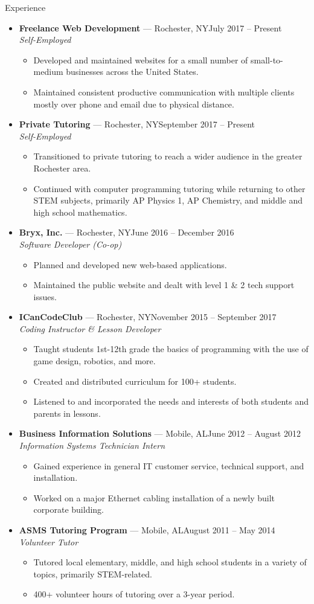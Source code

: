 \documentclass[10pt,oneside]{article}
\newenvironment{ressection}[1]{
	\vspace{3pt}
	{\fontfamily{bch}\selectfont\Large#1}
	\begin{itemize}
	\vspace{2pt}
}{
	\end{itemize}
}
\newcommand{\ressubitem}[1]{
	\vspace{-1pt}
	\item \begin{flushleft} #1 \end{flushleft}
}
\newcommand{\resbigitem}[3]{
	\vspace{-3pt}
	\item
	\textbf{#1} --- #2 \\
	\textit{#3}
}
\newenvironment{ressubsec}[3]{
	\resbigitem{#1}{#2}{#3}
	\vspace{-1pt}
	\begin{itemize}
}{
	\end{itemize}
}
\begin{document}
\begin{ressection}{Experience}

	\begin{ressubsec}{Freelance Web Development}{Rochester, NY\hfill July 2017 -- Present}{Self-Employed}
		\ressubitem{Developed and maintained websites for a small number of small-to-medium businesses across the United States.}
		\ressubitem{Maintained consistent productive communication with multiple clients mostly over phone and email due to physical distance.}
	\end{ressubsec}
	
	\begin{ressubsec}{Private Tutoring}{Rochester, NY\hfill September 2017 -- Present}{Self-Employed}
		\ressubitem{Transitioned to private tutoring to reach a wider audience in the greater Rochester area.}
		\ressubitem{Continued with computer programming tutoring while returning to other STEM subjects, primarily AP Physics 1, AP Chemistry, and middle and high school mathematics.}
	\end{ressubsec}
	
	\begin{ressubsec}{Bryx, Inc.}{Rochester, NY\hfill June 2016 -- December 2016}{Software Developer (Co-op)}
		\ressubitem{Planned and developed new web-based applications.}
		\ressubitem{Maintained the public website and dealt with level 1 \& 2 tech support issues.}
	\end{ressubsec}
	
	\begin{ressubsec}{ICanCodeClub}{Rochester, NY\hfill November 2015 -- September 2017}{Coding Instructor \& Lesson Developer}
		\ressubitem{Taught students 1st-12th grade the basics of programming with the use of game design, robotics, and more.}
		\ressubitem{Created and distributed curriculum for 100+ students.}
		\ressubitem{Listened to and incorporated the needs and interests of both students and parents in lessons.}
	\end{ressubsec}
	
	\begin{ressubsec}{Business Information Solutions}{Mobile, AL\hfill June 2012 -- August 2012}{Information Systems Technician Intern}
		\ressubitem{Gained experience in general IT customer service, technical support, and installation.}
		\ressubitem{Worked on a major Ethernet cabling installation of a newly built corporate building.}
	\end{ressubsec}
	
	\begin{ressubsec}{ASMS Tutoring Program}{Mobile, AL\hfill August 2011 -- May 2014}{Volunteer Tutor}
		\ressubitem{Tutored local elementary, middle, and high school students in a variety of topics, primarily STEM-related.}
		\ressubitem{400+ volunteer hours of tutoring over a 3-year period.}
	\end{ressubsec}

\end{ressection}
\end{document}
